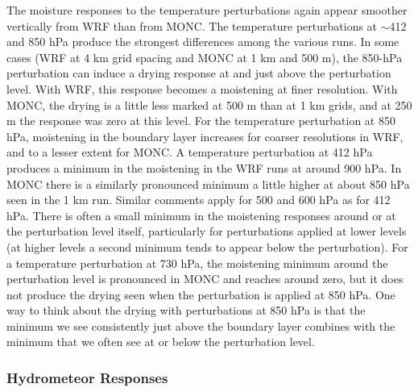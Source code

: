 \documentclass[draft]{agujournal2019}
\begin{document}
The moisture responses to the temperature perturbations again appear smoother vertically from WRF than from MONC. The temperature perturbations at
$\sim$412 and 850 hPa produce the strongest differences among the various runs.
In some cases (WRF at 4 km grid spacing and MONC at 1 km and 500 m), the 850-hPa perturbation
can induce a drying response at and just above the perturbation level. With WRF,
this response becomes a moistening at finer resolution. With MONC, the drying is
a little less marked at 500 m than at 1 km grids, and at 250 m the
response was zero at this level. For the temperature perturbation at 850 hPa,
moistening in the boundary layer increases for coarser resolutions in WRF, and
to a lesser extent for MONC. A temperature perturbation at 412 hPa produces a
minimum in the moistening in the WRF runs at around 900 hPa. In MONC there is a
similarly pronounced minimum a little higher at about 850 hPa seen in the 1 km
run. Similar comments apply for 500 and 600 hPa as for 412 hPa. There is often a
small minimum in the moistening responses around or at the perturbation level
itself, particularly for perturbations applied at lower levels (at higher levels
a second minimum tends to appear below the perturbation). For a
temperature perturbation at 730 hPa, the moistening minimum around the
perturbation level is pronounced in MONC and reaches around zero, but it does not
produce the drying seen when the perturbation is applied at 850 hPa. One way to
think about the drying with perturbations at 850 hPa is that the minimum we see
consistently just above the boundary layer combines with the minimum that we
often see at or below the perturbation level.

\subsubsection{Hydrometeor Responses}
\end{document}
